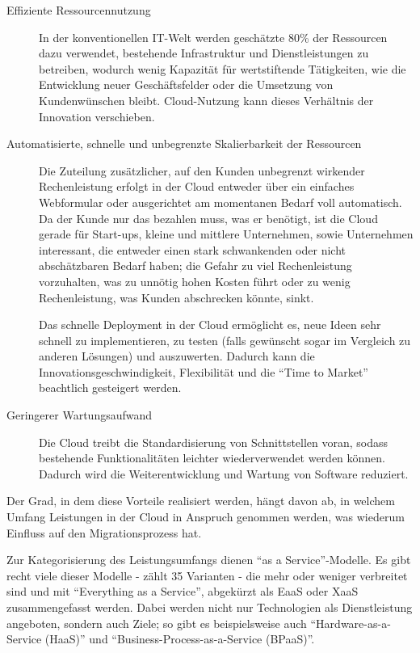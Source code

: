 \begin{description}
	\item[Effiziente Ressourcennutzung] In der konventionellen IT-Welt 
werden geschätzte 80\% der Ressourcen dazu verwendet, bestehende Infrastruktur 
und Dienstleistungen zu betreiben, wodurch wenig Kapazität für wertstiftende 
Tätigkeiten, wie die Entwicklung neuer Geschäftsfelder oder die Umsetzung von 
Kundenwünschen bleibt. Cloud-Nutzung kann 
dieses Verhältnis der Innovation verschieben. 

	\item[Automatisierte, schnelle und unbegrenzte Skalierbarkeit der 
Ressourcen] Die Zuteilung zusätzlicher, auf den Kunden unbegrenzt wirkender  
Rechenleistung erfolgt in der Cloud entweder über ein einfaches Webformular oder 
ausgerichtet am momentanen Bedarf voll automatisch. Da der Kunde nur das 
bezahlen muss, was er benötigt, ist die Cloud gerade für Start-ups, kleine und 
mittlere Unternehmen, sowie Unternehmen interessant, die entweder einen stark 
schwankenden oder nicht abschätzbaren Bedarf haben; die Gefahr zu viel 
Rechenleistung vorzuhalten, was zu unnötig hohen Kosten führt oder zu wenig 
Rechenleistung, was Kunden abschrecken könnte, 
sinkt. 

Das schnelle Deployment in der Cloud ermöglicht es, neue Ideen sehr 
schnell zu implementieren, zu testen (falls gewünscht sogar im Vergleich zu 
anderen Lösungen) und auszuwerten. Dadurch kann die Innovationsgeschwindigkeit, 
Flexibilität und die "`Time to Market"' beachtlich gesteigert werden. 

	\item[Geringerer Wartungsaufwand] Die Cloud treibt die Standardisierung 
von Schnittstellen voran, sodass bestehende Funktionalitäten leichter 
wiederverwendet werden können. Dadurch wird die Weiterentwicklung und Wartung 
von Software reduziert. 
\end{description}

Der Grad, in dem diese Vorteile realisiert werden, hängt davon ab, in welchem 
Umfang Leistungen in der Cloud in Anspruch genommen werden, was wiederum 
Einfluss auf den Migrationsprozess hat. 

Zur Kategorisierung des Leistungsumfangs dienen "`as a Service"'-Modelle. Es 
gibt recht viele dieser Modelle -  zählt 35 
Varianten - die mehr oder weniger verbreitet sind und mit "`Everything as a 
Service"', abgekürzt als EaaS oder XaaS zusammengefasst werden. Dabei werden 
nicht nur Technologien als Dienstleistung angeboten, sondern auch Ziele; so gibt 
es beispielsweise auch "`Hardware-as-a-Service (HaaS)"' und 
"`Business-Process-as-a-Service (BPaaS)"'. 
\\

